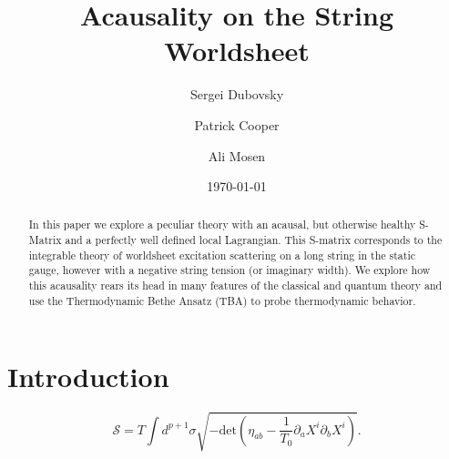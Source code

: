\documentclass[%
 reprint,
 amsmath,amssymb,
 aps,
]{revtex4-1}
\begin{document}
\title{Acausality on the String Worldsheet}

\author{Sergei Dubovsky}
\author{Patrick Cooper}
\author{Ali Mosen}

\date{\today}

\begin{abstract}
    In this paper we explore a peculiar theory with an acausal, but otherwise healthy S-Matrix and a perfectly well
    defined local Lagrangian.  This S-matrix corresponds to the integrable theory of worldsheet excitation scattering on
    a long string in the static gauge, however with a negative string tension (or imaginary width). We explore how this
    acausality rears its  head in many features of the classical and quantum theory and use the Thermodynamic Bethe
    Ansatz (TBA) to probe thermodynamic behavior.
\end{abstract}

\maketitle


\section{\label{sec:level1}Introduction}

\begin{equation}
    \label{action}
    \mathcal{S} = T \int d^{p+1} \sigma \sqrt{-\mathrm{det}(\eta_{a b} - \frac{1}{T_0} \partial_{a} X^i \partial_{b}
    X^i)} .
    \nonumber
\end{equation}

\end{document}
